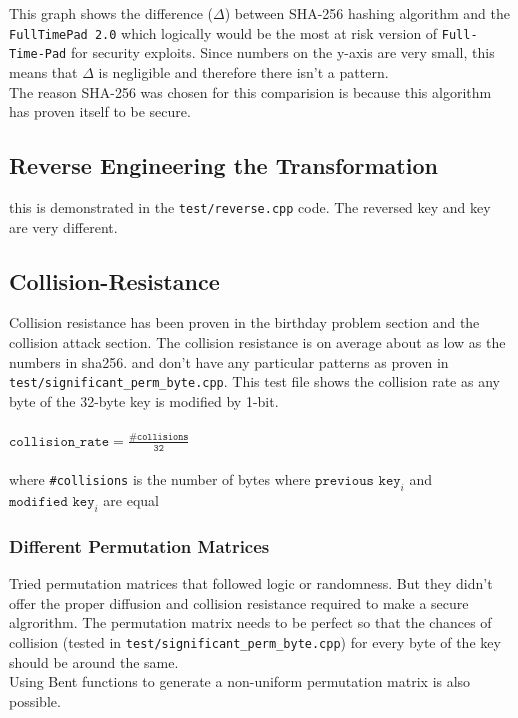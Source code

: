 \documentclass[fleqn, a4paper,12pt]{article}
\begin{document}
This graph shows the difference ($\Delta$) between SHA-256 hashing algorithm and the \texttt{FullTimePad 2.0} which logically would be the most at risk version of \texttt{Full-Time-Pad} for security exploits. Since numbers on the y-axis are very small, this means that $\Delta$ is negligible and therefore there isn't a pattern.
\\
The reason SHA-256 was chosen for this comparision is because this algorithm has proven itself to be secure.


\subsection{Reverse Engineering the Transformation}

this is demonstrated in the \texttt{test/reverse.cpp} code. The reversed key and key are very different.

\subsection{Collision-Resistance}

Collision resistance has been proven in the birthday problem section and the collision attack section. The collision resistance is on average about as low as the numbers in sha256. and don't have any particular patterns as proven in \texttt{test/significant\_perm\_byte.cpp}. This test file shows the collision rate as any byte of the 32-byte key is modified by 1-bit.
\\\\
$\texttt{collision\_rate} = \frac{\texttt{\#collisions}}{\texttt{32}}$\\
 \\ where \texttt{\#collisions} is the number of bytes where $\texttt{previous key}_i$ and $\texttt{modified key}_i$ are equal

\subsubsection{Different Permutation Matrices}

Tried permutation matrices that followed logic or randomness. But they didn't offer the proper diffusion and collision resistance required to make a secure algrorithm. The permutation matrix needs to be perfect so that the chances of collision (tested in \texttt{test/significant\_perm\_byte.cpp}) for every byte of the key should be around the same.\\
Using Bent functions to generate a non-uniform permutation matrix is also possible.
\end{document}
